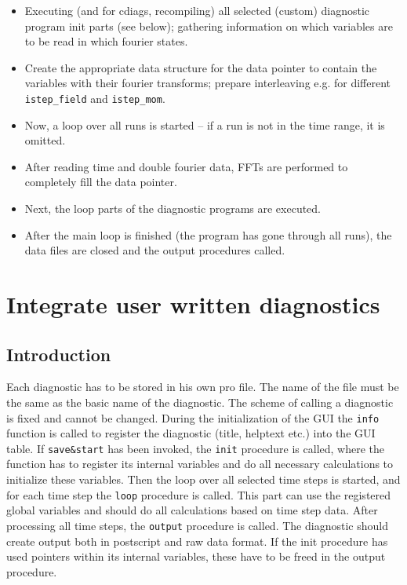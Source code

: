 \documentclass[12pt]{article}
\begin{document}
\begin{itemize}
\item Executing (and for cdiags, recompiling) all selected
(custom) diagnostic program init parts (see below); gathering
information on which variables are to be read in which fourier
states. \item Create the appropriate data structure for the data
pointer to contain the variables with their fourier transforms;
prepare interleaving e.g. for different \texttt{istep\_field} and
\texttt{istep\_mom}. \item Now, a loop over all runs is started --
if a run is not in the time range, it is omitted. \item After
reading time and double fourier data, FFTs are performed to
completely fill the data pointer. \item Next, the loop parts of
the diagnostic programs are executed. \item After the main loop is
finished (the program has gone through all runs), the data files
are closed and the output procedures called.
\end{itemize}


\section{Integrate user written diagnostics}

\subsection{Introduction}

Each diagnostic has to be stored in his own pro file. The name of
the file must be the same as the basic name of the diagnostic. The
scheme of calling a diagnostic is fixed and cannot be changed.
During the initialization of the GUI the \texttt{info} function is
called to register the diagnostic (title, helptext etc.) 
into the GUI table.
If \texttt{save\&start} has been invoked, the \texttt{init} procedure 
is called, where the function has to register its internal variables 
and do all necessary calculations to initialize these variables. 
Then the loop over all selected time steps is started, and for each
time step the \texttt{loop} procedure is called. This part can use the
registered global variables and should do all calculations based
on time step data. After processing all time steps, the
\texttt{output} procedure is called. The diagnostic should create
output both in postscript and raw data format. If the init
procedure has used pointers within its internal variables, these
have to be freed in the output procedure.
\end{document}

